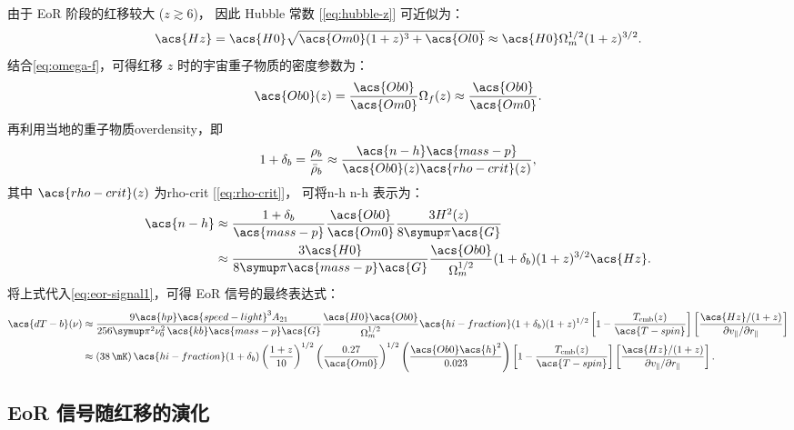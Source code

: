 由于 EoR 阶段的红移较大 ($z \gtrsim 6$)，
因此 Hubble 常数 [\autoref{eq:hubble-z}] 可近似为：
\begin{equation}
  \acs{Hz} = \acs{H0} \sqrt{\acs{Om0} (1+z)^3 + \acs{Ol0}}
    \approx \acs{H0} \Omega_m^{1/2} (1+z)^{3/2} .
\end{equation}
结合\autoref{eq:omega-f}，可得红移 $z$ 时的宇宙重子物质的密度参数为：
\begin{equation}
  \acs{Ob0}(z) = \frac{\acs{Ob0}}{\acs{Om0}} \Omega_f(z)
    \approx \frac{\acs{Ob0}}{\acs{Om0}} .
\end{equation}
再利用当地的重子物质\ac{overdensity}，即
\begin{equation}
  1 + \delta_b = \frac{\rho_b}{\bar{\rho}_b}
    \approx \frac{\acs{n-h} \acs{mass-p}}{\acs{Ob0}(z) \acs{rho-crit}(z)} ,
\end{equation}
其中 $\acs{rho-crit}(z)$ 为\acl{rho-crit} [\autoref{eq:rho-crit}]，
可将\acl{n-h} \acs{n-h} 表示为：
\begin{align}
  \acs{n-h}
    & \approx \frac{1+\delta_b}{\acs{mass-p}} \frac{\acs{Ob0}}{\acs{Om0}}
      \frac{3 H^2(z)}{8 \Cpi \acs{G}}  \\
    & \approx \frac{3 \acs{H0}}{8\Cpi\acs{mass-p}\acs{G}}
      \frac{\acs{Ob0}}{\Omega_m^{1/2}} (1+\delta_b) (1+z)^{3/2} \acs{Hz} .
\end{align}
将上式代入\autoref{eq:eor-signal1}，可得 EoR 信号的最终表达式：
\begin{align}
  \acs{dT-b}(\nu)
    & \approx \frac{9 \acs{hp} \acs{speed-light}^3 A_{21}}{
      256\Cpi^2 \nu_0^2 \,\acs{kb} \acs{mass-p} \acs{G}}
      \frac{\acs{H0} \acs{Ob0}}{\Omega_m^{1/2}}
      \acs{hi-fraction} (1+\delta_b) (1+z)^{1/2}
      \left[ 1 - \frac{T_{\R{cmb}}(z)}{\acs{T-spin}} \right]
      \left[ \frac{\acs{Hz} / (1+z)}{
        \partial v_{\parallel} / \partial r_{\parallel}} \right]
  \label{eq:eor-signal2}  \\
    & \approx \left( \SI{38}{\mK} \right)
      \acs{hi-fraction} (1+\delta_b)
      \left( \frac{1+z}{10} \right)^{1/2}
      \left( \frac{0.27}{\acs{Om0}} \right)^{1/2}
      \left( \frac{\acs{Ob0} \acs{h}^2}{0.023} \right)
      \left[ 1 - \frac{T_{\R{cmb}}(z)}{\acs{T-spin}} \right]
      \left[ \frac{\acs{Hz} / (1+z)}{
        \partial v_{\parallel} / \partial r_{\parallel}} \right] .
  \label{eq:eor-signal3}
\end{align}

\subsection{EoR 信号随红移的演化}

